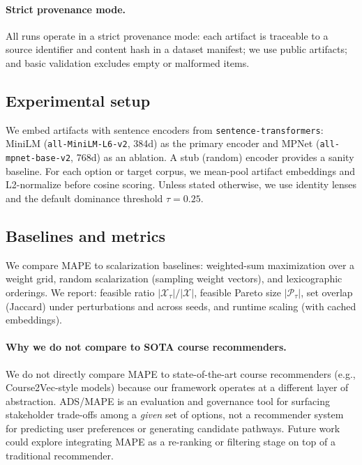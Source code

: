 \documentclass{article}
\newcommand{\ADS}{\textsc{ADS}\xspace}
\newcommand{\MAPE}{\textsc{MAPE}\xspace}
\begin{document}
\paragraph{Strict provenance mode.}
All runs operate in a strict provenance mode: each artifact is traceable to a source identifier and content hash in a dataset manifest; we use public artifacts; and basic validation excludes empty or malformed items.



\subsection{Experimental setup}
We embed artifacts with sentence encoders from \texttt{sentence-transformers}: MiniLM (\texttt{all-MiniLM-L6-v2}, 384d) as the primary encoder and MPNet (\texttt{all-mpnet-base-v2}, 768d) as an ablation. A stub (random) encoder provides a sanity baseline. For each option or target corpus, we mean-pool artifact embeddings and L2-normalize before cosine scoring. Unless stated otherwise, we use identity lenses and the default dominance threshold $\tau{=}0.25$.

\subsection{Baselines and metrics}
We compare \MAPE to scalarization baselines: weighted-sum maximization over a weight grid, random scalarization (sampling weight vectors), and lexicographic orderings. We report: feasible ratio $|\mathcal{X}_\tau|/|\mathcal{X}|$, feasible Pareto size $|\mathcal{P}_\tau|$, set overlap (Jaccard) under perturbations and across seeds, and runtime scaling (with cached embeddings).

\paragraph{Why we do not compare to SOTA course recommenders.}
We do not directly compare \MAPE to state-of-the-art course recommenders (e.g., Course2Vec-style models\cite{morsy2019course2vec}) because our framework operates at a different layer of abstraction. \ADS/\MAPE is an evaluation and governance tool for surfacing stakeholder trade-offs among a \emph{given} set of options, not a recommender system for predicting user preferences or generating candidate pathways. Future work could explore integrating \MAPE as a re-ranking or filtering stage on top of a traditional recommender.
\end{document}
